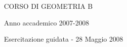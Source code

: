 %
%


\def\NN{{\Bbb{N}}}
\def\ZZ{{\Bbb{Z}}}
\def\QQ{{\Bbb{Q}}}
\def\RR{{\Bbb{R}}}
\def\CC{{\Bbb{C}}}

\def\to{\rightarrow}
\def\To{\longrightarrow}

\setlength{\textwidth}{16cm}
\setlength{\textheight}{22cm}

\oddsidemargin=-0mm
\evensidemargin=-0mm
\topmargin=-15mm



\centerline {\Large CORSO DI GEOMETRIA B}

\bigskip

\centerline {\large Anno accademico 2007-2008}

\bigskip

\centerline {\large Esercitazione guidata - 28 Maggio 2008}

\bigskip


